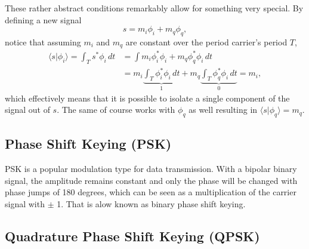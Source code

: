 These rather abstract conditions remarkably allow for something very special. By defining a new signal 
\begin{equation}
	s = m_i\phi_i + m_q\phi_q,
\end{equation}
notice that assuming \(m_i\) and \(m_q\) are constant over the period carrier's period \(T\),
\begin{align*}
	\langle s | \phi_i \rangle = \int_T s^* \phi_i \,dt
		&= \int m_i \phi_i^* \phi_i + m_q \phi_q^* \phi_i \,dt \\
		&= m_i \underbrace{\int_T \phi_i^* \phi_i \,dt}_{1}
			+ m_q \underbrace{\int_T \phi_q^* \phi_i \,dt}_{0} = m_i,
\end{align*}
which effectively means that it is possible to isolate a single component of the signal out of \(s\). The same of course works with \(\phi_q\) as well resulting in \(\langle s | \phi_q \rangle = m_q\).


% 	

\subsection{Phase Shift Keying (PSK)}

PSK is a popular modulation type for data transmission\cite{Meyer2011}. With a bipolar binary signal, the amplitude remains constant and only the phase will be changed with phase jumps of 180 degrees, which can be seen as a multiplication of the carrier signal with $\pm$ 1. That is alow known as binary phase shift keying.


\subsection{Quadrature Phase Shift Keying (QPSK)}

